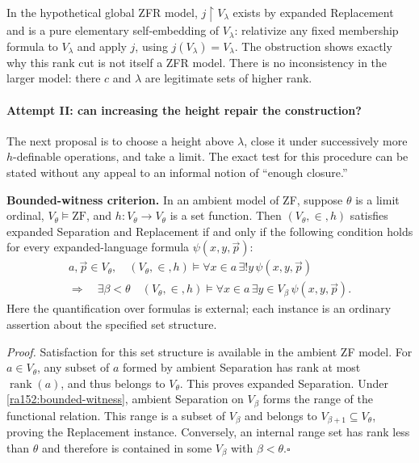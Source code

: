 \documentclass[11pt]{article}
\begin{document}
In the hypothetical global ZFR model, $j\!\upharpoonright\!V_\lambda$ exists
by expanded Replacement and is a pure elementary self-embedding of
$V_\lambda$: relativize any fixed membership formula to $V_\lambda$ and
apply $j$, using $j(V_\lambda)=V_\lambda$.  The obstruction shows exactly why
this rank cut is not itself a ZFR model.  There is no inconsistency in the
larger model: there $c$ and $\lambda$ are legitimate sets of higher rank.

\paragraph{Attempt II: can increasing the height repair the construction?}
The next proposal is to choose a height above $\lambda$, close it under
successively more $h$-definable operations, and take a limit.  The exact test
for this procedure can be stated without any appeal to an informal notion
of ``enough closure.''

\textbf{Bounded-witness criterion.}
In an ambient model of ZF, suppose $\theta$ is a limit ordinal,
$V_\theta\models\mathrm{ZF}$, and $h:V_\theta\to V_\theta$ is a set function.
Then $(V_\theta,\in,h)$ satisfies expanded Separation and Replacement if and
only if the following condition holds for every expanded-language formula
$\psi(x,y,\vec p)$:
\begin{equation}\label{ra152:bounded-witness}
 \begin{gathered}
 a,\vec p\in V_\theta,\quad
 (V_\theta,\in,h)\models\forall x\in a\,\exists!y\,\psi(x,y,\vec p)
 \\[-2pt]
 \Longrightarrow\quad
 \exists\beta<\theta\quad
 (V_\theta,\in,h)\models
 \forall x\in a\,\exists y\in V_\beta\,\psi(x,y,\vec p).
 \end{gathered}
\end{equation}
Here the quantification over formulas is external; each instance is an
ordinary assertion about the specified set structure.

\emph{Proof.}
Satisfaction for this set structure is available in the ambient ZF model.
For $a\in V_\theta$, any subset of $a$ formed by ambient Separation has rank
at most $\operatorname{rank}(a)$, and thus belongs to $V_\theta$.  This proves
expanded Separation.  Under \eqref{ra152:bounded-witness}, ambient Separation
on $V_\beta$ forms the range of the functional relation.  This range is a
subset of $V_\beta$ and belongs to $V_{\beta+1}\subseteq V_\theta$, proving
the Replacement instance.  Conversely, an internal range set has rank less
than $\theta$ and therefore is contained in some $V_\beta$ with
$\beta<\theta$.\hfill$\square$
\end{document}
